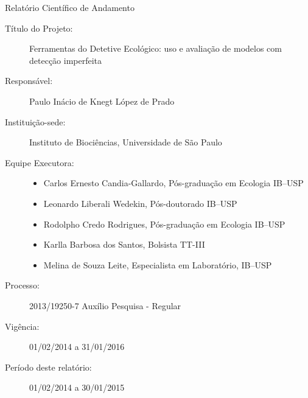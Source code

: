 {\fancyplain{}{\textsl{\thepage}}}
\begin{center}
  {\LARGE Relatório Científico de Andamento} 
\end{center}
\begin{description}
\item[Título do Projeto:] Ferramentas do Detetive Ecológico: uso e avaliação de modelos com detecção imperfeita
\item[Responsável:] Paulo Inácio de Knegt López de Prado
\item[Instituição-sede:] Instituto de Biociências, Universidade de São Paulo
\item[Equipe Executora:]
  \begin{itemize}
  \item Carlos Ernesto Candia-Gallardo, Pós-graduação em Ecologia IB--USP
  \item Leonardo Liberali Wedekin, Pós-doutorado IB--USP
  \item Rodolpho Credo Rodrigues, Pós-graduação em Ecologia IB--USP
  \item Karlla Barbosa dos Santos, Bolsista TT-III
  \item Melina de Souza Leite, Especialista em Laboratório, IB--USP
  \end{itemize}
\item[Processo:] 2013/19250-7 Auxílio Pesquisa - Regular 
\item[Vigência:] 01/02/2014 a 31/01/2016 
\item[Período deste relatório:] 01/02/2014 a 30/01/2015
\end{description}
